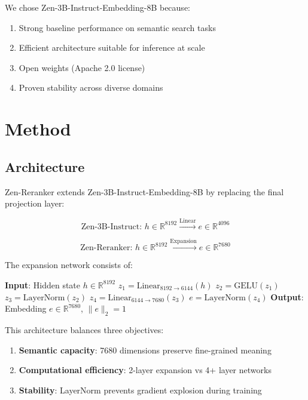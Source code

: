 \documentclass[11pt,letterpaper]{article}
\begin{document}
We chose Zen-3B-Instruct-Embedding-8B because:
\begin{enumerate}
    \item Strong baseline performance on semantic search tasks
    \item Efficient architecture suitable for inference at scale
    \item Open weights (Apache 2.0 license)
    \item Proven stability across diverse domains
\end{enumerate}

\section{Method}

\subsection{Architecture}

Zen-Reranker extends Zen-3B-Instruct-Embedding-8B by replacing the final projection layer:

\begin{equation}
\text{Zen-3B-Instruct: } h \in \mathbb{R}^{8192} \xrightarrow{\text{Linear}} e \in \mathbb{R}^{4096}
\end{equation}

\begin{equation}
\text{Zen-Reranker: } h \in \mathbb{R}^{8192} \xrightarrow{\text{Expansion}} e \in \mathbb{R}^{7680}
\end{equation}

The expansion network consists of:

\begin{algorithm}
\caption{Zen-Reranker Projection Head}
\begin{algorithmic}
\STATE \textbf{Input}: Hidden state $h \in \mathbb{R}^{8192}$
\STATE $z_1 = \text{Linear}_{8192 \to 6144}(h)$
\STATE $z_2 = \text{GELU}(z_1)$
\STATE $z_3 = \text{LayerNorm}(z_2)$
\STATE $z_4 = \text{Linear}_{6144 \to 7680}(z_3)$
\STATE $e = \text{LayerNorm}(z_4)$
\STATE \textbf{Output}: Embedding $e \in \mathbb{R}^{7680}$, $\|e\|_2 = 1$
\end{algorithmic}
\end{algorithm}

This architecture balances three objectives:
\begin{enumerate}
    \item \textbf{Semantic capacity}: 7680 dimensions preserve fine-grained meaning
    \item \textbf{Computational efficiency}: 2-layer expansion vs 4+ layer networks
    \item \textbf{Stability}: LayerNorm prevents gradient explosion during training
\end{enumerate}
\end{document}
